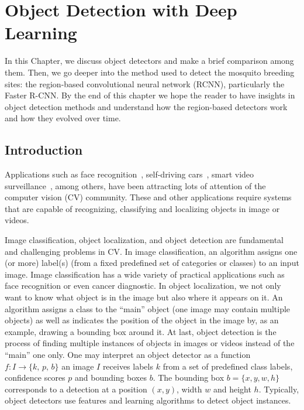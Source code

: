 \chapter{Object Detection with Deep Learning}
\label{chap:system}
%
In this Chapter, we discuss object detectors and make a brief comparison among them.
Then, we go deeper into the method used to detect the mosquito breeding sites: the region-based convolutional neural network (RCNN),
particularly the Faster R-CNN.
By the end of this chapter we hope the reader to have insights in object detection methods and understand how the region-based detectors work and how they evolved over time.

\section{Introduction}
Applications such as face recognition~\cite{taigman2014, schroff2015facenet, Passos2018face}, self-driving cars~\cite{Chen2015drive}, smart video surveillance~\cite{Afonso2018vdao}, among others, have been attracting lots of attention of the computer vision (CV) community.
These and other applications require systems that are capable of recognizing, classifying and localizing objects in image or videos.

Image classification, object localization, and object detection are fundamental and challenging problems
in CV.
%
In image classification, an algorithm assigns one (or more) label(s) (from a fixed predefined set of categories or classes) to an input image.
Image classification has a wide variety of practical applications such as face recognition or even cancer diagnostic.
%
In object localization, we not only want to know what object is in the image but also where it appears on it.
An algorithm assigns a class to the ``main'' object (one image may contain multiple objects) as well as indicates the position of the object in the image by, as an example, drawing a bounding box around it.
%
At last, object detection is the process of finding multiple instances of objects in images or videos instead of the ``main'' one only.
One may interpret an object detector as a function $f: I\rightarrow\{k,\, p,\, b\}$ \ie an image $I$ receives labels $k$ from a set of predefined class labels, confidence scores $p$ and bounding boxes $b$.
The bounding box $b = \{x, y, w, h\}$ corresponds to a detection at a position $(x,y)$, width $w$ and height $h$.
Typically, object detectors use features and learning algorithms to detect object instances.

